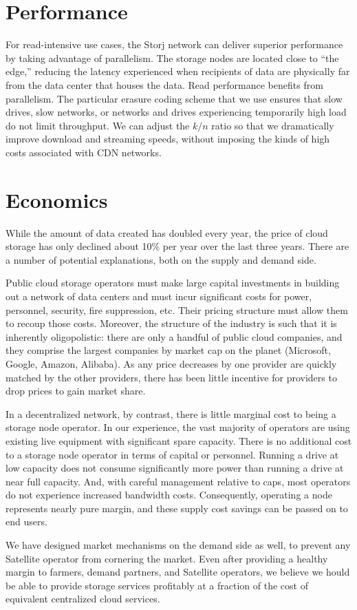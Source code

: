 \documentclass[8pt,fleqn,openany]{book}
\begin{document}
\section{Performance}

For read-intensive use cases, the Storj network can deliver superior
performance by taking advantage of parallelism. The storage nodes are located
close to ``the edge,'' reducing the latency experienced when recipients of
data are physically far from the data center that houses the data.
Read performance benefits from parallelism. The particular erasure coding
scheme that we use ensures that slow drives, slow networks, or networks and
drives experiencing temporarily high load do not limit throughput. We can
adjust the $k/n$ ratio so that we dramatically improve download and streaming
speeds, without imposing the kinds of high costs associated with CDN networks.

\section{Economics}

While the amount of data created has doubled every year, the price of cloud
storage has only declined about 10\% per year over the last three years.
There are a number of potential explanations, both on the supply and demand
side.

Public cloud storage operators must make large capital investments in
building out a network of data centers and must incur significant costs for
power, personnel, security, fire suppression, etc. Their pricing structure
must allow them to recoup those costs. Moreover, the structure of the
industry is such that it is inherently oligopolistic: there are only a
handful of public cloud companies, and they comprise the largest companies by
market cap on the planet (Microsoft, Google, Amazon, Alibaba).
As any price decreases by one provider are quickly matched by the other
providers, there has been little incentive for providers to drop prices to
gain market share.

In a decentralized network, by contrast, there is little
marginal cost to being a storage node operator. In our experience, the vast
majority of operators are using existing live equipment with significant spare
capacity. There is no additional cost to a storage node operator in terms of
capital or personnel. Running a drive at low capacity does not consume
significantly more power than running a drive at near full capacity. And, with
careful management relative to caps, most operators do not experience
increased bandwidth costs. Consequently, operating a node represents nearly
pure margin, and these supply cost savings can be passed on to end users.

We have designed market mechanisms on the demand side as well, to prevent any
Satellite operator from cornering the market. Even after providing a healthy
margin to farmers, demand partners, and Satellite operators, we believe we
hould be able to provide storage services profitably at a fraction of the cost
of equivalent centralized cloud services.

\newpage

\begingroup
\raggedright

\endgroup
\end{document}
